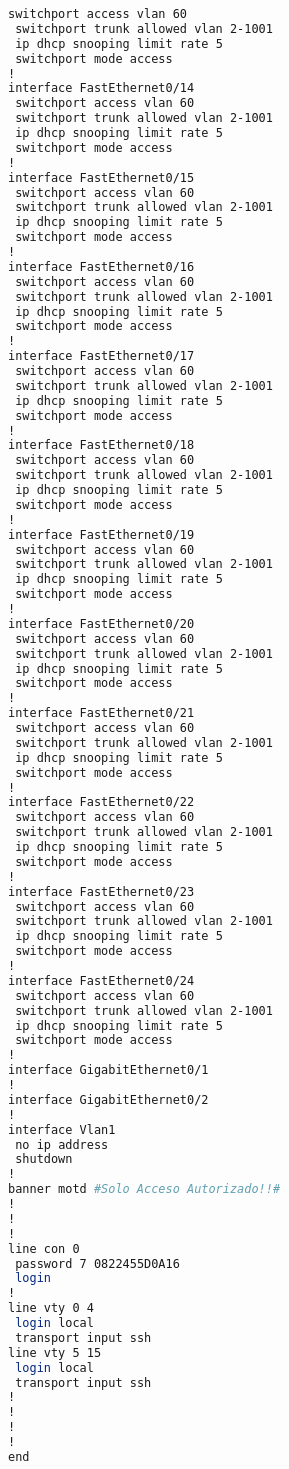 \begin{lstlisting}[language=Bash, caption={Configuración Completa Switch Dermatologia}]
 switchport access vlan 60
 switchport trunk allowed vlan 2-1001
 ip dhcp snooping limit rate 5
 switchport mode access
!
interface FastEthernet0/14
 switchport access vlan 60
 switchport trunk allowed vlan 2-1001
 ip dhcp snooping limit rate 5
 switchport mode access
!
interface FastEthernet0/15
 switchport access vlan 60
 switchport trunk allowed vlan 2-1001
 ip dhcp snooping limit rate 5
 switchport mode access
!
interface FastEthernet0/16
 switchport access vlan 60
 switchport trunk allowed vlan 2-1001
 ip dhcp snooping limit rate 5
 switchport mode access
!
interface FastEthernet0/17
 switchport access vlan 60
 switchport trunk allowed vlan 2-1001
 ip dhcp snooping limit rate 5
 switchport mode access
!
interface FastEthernet0/18
 switchport access vlan 60
 switchport trunk allowed vlan 2-1001
 ip dhcp snooping limit rate 5
 switchport mode access
!
interface FastEthernet0/19
 switchport access vlan 60
 switchport trunk allowed vlan 2-1001
 ip dhcp snooping limit rate 5
 switchport mode access
!
interface FastEthernet0/20
 switchport access vlan 60
 switchport trunk allowed vlan 2-1001
 ip dhcp snooping limit rate 5
 switchport mode access
!
interface FastEthernet0/21
 switchport access vlan 60
 switchport trunk allowed vlan 2-1001
 ip dhcp snooping limit rate 5
 switchport mode access
!
interface FastEthernet0/22
 switchport access vlan 60
 switchport trunk allowed vlan 2-1001
 ip dhcp snooping limit rate 5
 switchport mode access
!
interface FastEthernet0/23
 switchport access vlan 60
 switchport trunk allowed vlan 2-1001
 ip dhcp snooping limit rate 5
 switchport mode access
!
interface FastEthernet0/24
 switchport access vlan 60
 switchport trunk allowed vlan 2-1001
 ip dhcp snooping limit rate 5
 switchport mode access
!
interface GigabitEthernet0/1
!
interface GigabitEthernet0/2
!
interface Vlan1
 no ip address
 shutdown
!
banner motd #Solo Acceso Autorizado!!#
!
!
!
line con 0
 password 7 0822455D0A16
 login
!
line vty 0 4
 login local
 transport input ssh
line vty 5 15
 login local
 transport input ssh
!
!
!
!
end
\end{lstlisting}
